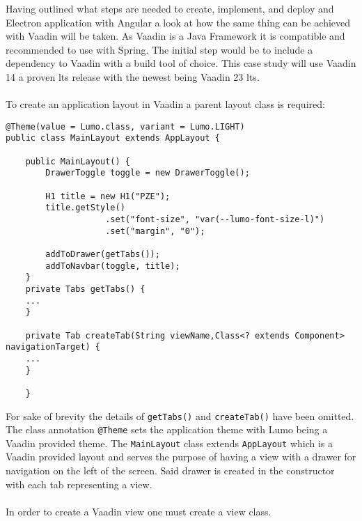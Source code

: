 
Having outlined what steps are needed to create, implement, and deploy and Electron application
with Angular a look at how the same thing can be achieved with Vaadin will be taken.
As Vaadin is a Java Framework it is compatible and recommended to use with Spring. \parencite{vaadinDocs}
The initial step would be to include a dependency to Vaadin with a build tool of choice. 
This case study will use Vaadin 14 a proven \acrfull{lts} release with the newest being Vaadin 23 \acrshort{lts}.\paragraph{}
To create an application layout in Vaadin a parent layout class is required:
\begin{lstlisting}[caption=Creating a MainLayout.java class]
@Theme(value = Lumo.class, variant = Lumo.LIGHT)
public class MainLayout extends AppLayout {
    
    public MainLayout() {
        DrawerToggle toggle = new DrawerToggle();
    
        H1 title = new H1("PZE");
        title.getStyle()
                    .set("font-size", "var(--lumo-font-size-l)")
                    .set("margin", "0");
    
        addToDrawer(getTabs());
        addToNavbar(toggle, title);
    }
    private Tabs getTabs() {
    ...
    }
    
    private Tab createTab(String viewName,Class<? extends Component> navigationTarget) {
    ...
    }
    
    }
\end{lstlisting}
For sake of brevity the details of \lstinline[columns=fixed]{getTabs()} and \lstinline[columns=fixed]{createTab()} 
have been omitted. 
The class annotation \lstinline[columns=fixed]{@Theme} sets the application theme with Lumo being a Vaadin provided theme.
The \lstinline[columns=fixed]{MainLayout} class extends \lstinline[columns=fixed]{AppLayout} which is a Vaadin provided
layout and serves the purpose of having a view with a drawer for navigation on the left of the screen.  
Said drawer is created in the constructor with each tab representing a view.\paragraph{}
In order to create a Vaadin view one must create a view class. 

